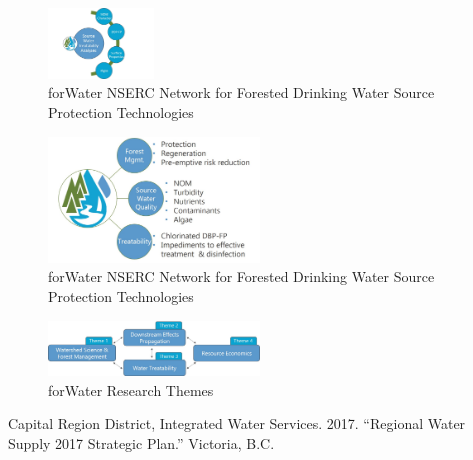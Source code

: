 \documentclass[]{article}
\begin{document}
\begin{figure}
\centering
\includegraphics[width=0.25000\textwidth]{images/SourceWater-forWater_smartart.jpg}
\caption{forWater NSERC Network for Forested Drinking Water Source
Protection Technologies}
\end{figure}

\begin{figure}
\centering
\includegraphics[width=0.50000\textwidth]{images/forWater_smartart.jpg}
\caption{forWater NSERC Network for Forested Drinking Water Source
Protection Technologies}
\end{figure}

\begin{figure}
\centering
\includegraphics[width=0.50000\textwidth]{images/forWater_themes.jpg}
\caption{forWater Research Themes}
\end{figure}

\hypertarget{refs}{}
\hypertarget{ref-CapitalRegionDistrict2017}{}
Capital Region District, Integrated Water Services. 2017. ``Regional
Water Supply 2017 Strategic Plan.'' Victoria, B.C.
\end{document}
